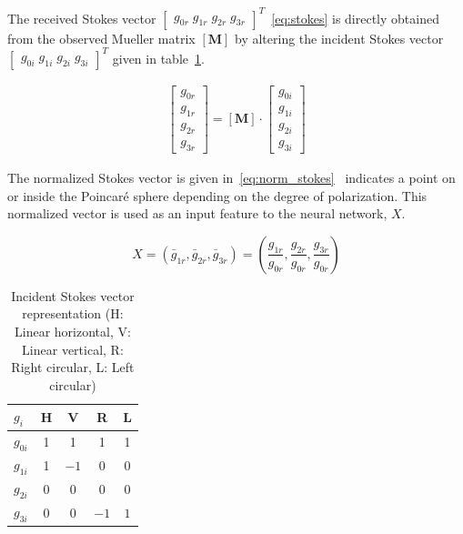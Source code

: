 The received Stokes vector $\begin{bmatrix} g_{0r} \; g_{1r} \; g_{2r} \; g_{3r} \end{bmatrix}^{T}$~\eqref{eq:stokes} is directly obtained from the observed Mueller matrix $[\mathbf{M}]$ by altering the incident Stokes vector $\begin{bmatrix} g_{0i} \; g_{1i} \; g_{2i} \; g_{3i} \end{bmatrix}^{T}$ given in table~\ref{tab:K_models}.

\begin{gather}
 \begin{bmatrix} g_{0r} \\ g_{1r} \\ g_{2r} \\ g_{3r} \end{bmatrix}
 =
  [\mathbf{M}] \cdot
 \begin{bmatrix} g_{0i} \\ g_{1i} \\ g_{2i} \\ g_{3i} \end{bmatrix}
 \label{eq:stokes}
\end{gather}

The normalized Stokes vector is given in~\eqref{eq:norm_stokes}~\cite{Shang_QNN_2014} indicates a point on or inside the Poincar\'e sphere depending on the degree of polarization. This normalized vector is used as an input feature to the neural network, $X$. 

\begin{equation}
X = (\bar{g}_{1r}, \bar{g}_{2r}, \bar{g}_{3r}) = \left(\frac{g_{1r}}{g_{0r}}, \frac{g_{2r}}{g_{0r}}, \frac{g_{3r}}{g_{0r}} \right)
\label{eq:norm_stokes}
\end{equation}

\begin{table}[tp]
\centering
\caption{Incident Stokes vector representation (H: Linear horizontal, V: Linear vertical, R: Right circular, L: Left circular)}
\label{tab:K_models}
\begin{tabular}{lcccc}
$g_{i}$ & H & V & R & L\\ \hline
$g_{0i}$ & 1 & 1 & 1 & 1 \\ 
$g_{1i}$ & 1 & $-1$ & 0 & 0 \\ 
$g_{2i}$ & 0 & 0 & 0 & 0 \\ 
$g_{3i}$ & 0 & 0 & $-1$ & $1$ \\ 
\end{tabular}
\end{table}



